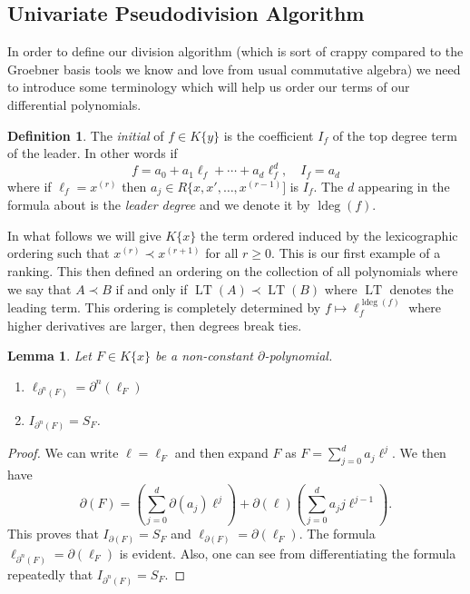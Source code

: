 \documentclass[12pt]{book}
\numberwithin{equation}{section}
\newtheorem{lemma}[theorem]{Lemma}
\theoremstyle{definition}
\newtheorem{definition}[theorem]{Definition}
\theoremstyle{remark}
\newcommand{\LT}{\operatorname{LT}}
\newcommand{\ldeg}{\operatorname{ldeg}}
\begin{document}
\subsection{Univariate Pseudodivision Algorithm}

In order to define our division algorithm (which is sort of crappy compared to the Groebner basis tools we know and love from usual commutative algebra) we need to introduce some terminology which will help us order our terms of our differential polynomials.
\begin{definition}
	The \emph{initial} of $f \in K \lbrace y \rbrace$ is the coefficient $I_f$ of the top degree term of the leader.
	In other words if 
	$$ f = a_0 + a_1 \ell_f + \cdots + a_d \ell_f^d, \quad I_f = a_d $$
	where if $\ell_f = x^{(r)}$ then $a_j \in R\lbrace x,x',\ldots,x^{(r-1)}]$ is $I_f$. 
	The $d$ appearing in the formula about is the \emph{leader degree} and we denote it by $\ldeg(f)$.
\end{definition}

In what follows we will give $K\lbrace x \rbrace$ the term ordered induced by the lexicographic ordering such that $x^{(r)} \prec x^{(r+1)}$ for all $r\geq 0$. 
This is our first example of a ranking. 
This then defined an ordering on the collection of all polynomials where we say that $A\prec B$ if and only if $\LT(A)\prec\LT(B)$ where $\LT$ denotes the leading term.
This ordering is completely determined by $f\mapsto \ell_f^{\ldeg(f)}$ where higher derivatives are larger, then degrees break ties. 



\begin{lemma}
	Let $F \in K\lbrace x \rbrace$ be a non-constant $\partial$-polynomial. 
	\begin{enumerate}[topsep=0pt]
		\item $\ell_{\partial^n(F)} = \partial^n(\ell_F)$
		\item $I_{\partial^n(F)} = S_F$.
	\end{enumerate}
\end{lemma}
\begin{proof}
	We can write $\ell=\ell_F$ and then expand $F$ as $ F = \sum_{j=0}^d a_j \ell^j$.
	We then have 
	 $$ \partial(F) = \left( \sum_{j=0}^d \partial(a_j) \ell^j\right) + \partial(\ell) \left( \sum_{j=0}^d a_j j \ell^{j-1} \right ). $$
	This proves that $I_{\partial(F)} = S_F$ and $\ell_{\partial(F)} = \partial(\ell_F)$.
	The formula $\ell_{\partial^n(F)}=\partial(\ell_F)$ is evident. 
	Also, one can see from differentiating the formula repeatedly that $I_{\partial^n(F)} = S_F$. 
\end{proof}
\end{document}
